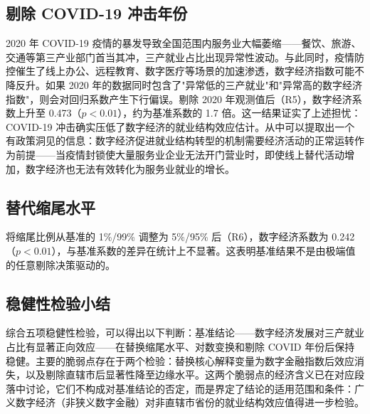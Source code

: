 \subsection{剔除 COVID-19 冲击年份}

2020 年 COVID-19 疫情的暴发导致全国范围内服务业大幅萎缩——餐饮、旅游、交通等第三产业部门首当其冲，三产就业占比出现异常性波动。与此同时，疫情防控催生了线上办公、远程教育、数字医疗等场景的加速渗透，数字经济指数可能不降反升。如果 2020 年的数据同时包含了"异常低的三产就业"和"异常高的数字经济指数"，则会对回归系数产生下行偏误。剔除 2020 年观测值后（R5），数字经济系数上升至 0.473（$p<0.01$），约为基准系数的 1.7 倍。这一结果证实了上述担忧：COVID-19 冲击确实压低了数字经济的就业结构效应估计。从中可以提取出一个有政策洞见的信息：数字经济促进就业结构转型的机制需要经济活动的正常运转作为前提——当疫情封锁使大量服务业企业无法开门营业时，即使线上替代活动增加，数字经济也无法有效转化为服务业就业的增长。

\subsection{替代缩尾水平}

将缩尾比例从基准的 1\%/99\% 调整为 5\%/95\% 后（R6），数字经济系数为 0.242（$p<0.01$），与基准系数的差异在统计上不显著。这表明基准结果不是由极端值的任意剔除决策驱动的。

\subsection{稳健性检验小结}

综合五项稳健性检验，可以得出以下判断：基准结论——数字经济发展对三产就业占比有显著正向效应——在替换缩尾水平、对数变换和剔除 COVID 年份后保持稳健。主要的脆弱点存在于两个检验：替换核心解释变量为数字金融指数后效应消失，以及剔除直辖市后显著性降至边缘水平。这两个脆弱点的经济含义已在对应段落中讨论，它们不构成对基准结论的否定，而是界定了结论的适用范围和条件：广义数字经济（非狭义数字金融）对非直辖市省份的就业结构效应值得进一步检验。
